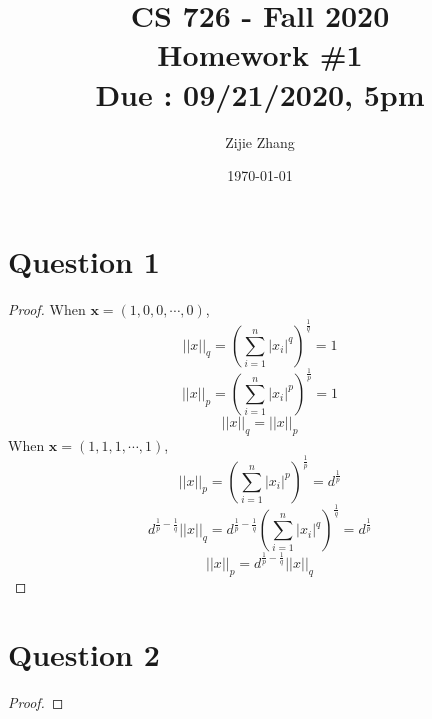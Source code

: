 \documentclass{article}
\title{CS 726 - Fall 2020\\
        {\Large \textbf{Homework \#1}}\\
        {\normalsize \textbf{Due : 09/21/2020, 5pm}}
    }
\author{Zijie Zhang}
\date{\today}
\begin{document}
    \maketitle

\section*{Question 1}
    \begin{proof}
    When $\boldsymbol{x} = (1,0,0,\cdots,0)$,
    $$ ||x||_q = \left(\sum_{i=1}^n|x_i|^q\right)^{\frac{1}{q}} = 1 $$
    $$ ||x||_p = \left(\sum_{i=1}^n|x_i|^p\right)^{\frac{1}{p}} = 1 $$
    $$ ||x||_q = ||x||_p $$
    When $\boldsymbol{x} = (1,1,1,\cdots,1)$,
    $$ ||x||_p = \left(\sum_{i=1}^n|x_i|^p\right)^{\frac{1}{p}} = d^{\frac{1}{p}} $$
    $$ d^{\frac{1}{p}-\frac{1}{q}}||x||_q = d^{\frac{1}{p}-\frac{1}{q}} \left(\sum_{i=1}^n|x_i|^q\right)^{\frac{1}{q}} = d^{\frac{1}{p}} $$
    $$ ||x||_p = d^{\frac{1}{p}-\frac{1}{q}}||x||_q $$
    \end{proof}

\section*{Question 2}
    \begin{proof}
        
    \end{proof}
\end{document}
